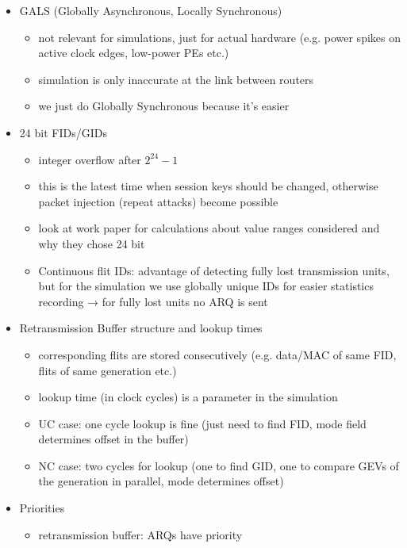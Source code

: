 \begin{itemize}
    \item GALS (Globally Asynchronous, Locally Synchronous)
        \begin{itemize}
            \item not relevant for simulations, just for actual hardware (e.g. power spikes on active clock edges, low-power PEs etc.)
            \item simulation is only inaccurate at the link between routers
            \item we just do Globally Synchronous because it's easier
        \end{itemize}
    \item 24 bit FIDs/GIDs
        \begin{itemize}
            \item integer overflow after $2^{24}-1$
            \item this is the latest time when session keys should be changed, otherwise packet injection (repeat attacks) become
                possible
            \item look at work paper for calculations about value ranges considered and why they chose 24 bit
            \item Continuous flit IDs: advantage of detecting fully lost transmission units, but for the simulation we use globally unique IDs for
                easier statistics recording → for fully lost units no ARQ is sent
        \end{itemize}
    \item Retransmission Buffer structure and lookup times
        \begin{itemize}
            \item corresponding flits are stored consecutively (e.g. data/MAC of same FID, flits of same generation etc.)
            \item lookup time (in clock cycles) is a parameter in the simulation
            \item UC case: one cycle lookup is fine (just need to find FID, mode field determines offset in the buffer)
            \item NC case: two cycles for lookup (one to find GID, one to compare GEVs of the generation in parallel, mode determines offset)
        \end{itemize}
    \item Priorities
        \begin{itemize}
            \item retransmission buffer: ARQs have priority

\end{itemize}
\end{itemize}
